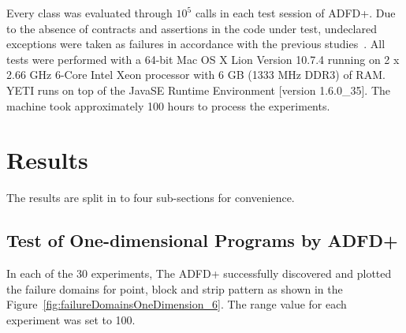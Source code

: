 Every class was evaluated through $10^5$ calls in each test session of ADFD+.
Due to the absence of contracts and assertions in the code under test, undeclared exceptions were taken as failures in accordance with the previous studies~\cite{ahmad2013adfd, Oriol2011yeti}. All tests were performed with a 64-bit Mac OS X Lion Version 10.7.4 running on 2 x 2.66 GHz 6-Core Intel Xeon processor with 6 GB (1333 MHz DDR3) of RAM. YETI runs on top of the Java\texttrademark  SE Runtime Environment [version 1.6.0\_35]. The machine took approximately 100 hours to process the experiments.

\section{Results}

The results are split in to four sub-sections for convenience. 


\subsection{Test of One-dimensional Programs by ADFD+}\label{sec:intro6_10}
In each of the 30 experiments, The ADFD+ successfully discovered and plotted the failure domains for point, block and strip pattern as shown in the Figure~\ref{fig:failureDomainsOneDimension_6}. The range value for each experiment was set to 100.


